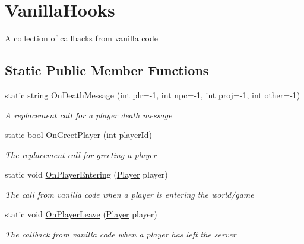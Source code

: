 \hypertarget{classOTA_1_1Callbacks_1_1VanillaHooks}{}\section{Vanilla\+Hooks}
\label{classOTA_1_1Callbacks_1_1VanillaHooks}


A collection of callbacks from vanilla code  


\subsection*{Static Public Member Functions}
\begin{DoxyCompactItemize}
\item 
static string \hyperlink{classOTA_1_1Callbacks_1_1VanillaHooks_af6587696a49cfe8ded654d3584e78f9a}{On\+Death\+Message} (int plr=-\/1, int npc=-\/1, int proj=-\/1, int other=-\/1)
\begin{DoxyCompactList}\small\item\em A replacement call for a player death message \end{DoxyCompactList}\item 
static bool \hyperlink{classOTA_1_1Callbacks_1_1VanillaHooks_a7745ee3ce6ec00d571ea2ad41b8c9979}{On\+Greet\+Player} (int player\+Id)
\begin{DoxyCompactList}\small\item\em The replacement call for greeting a player \end{DoxyCompactList}\item 
static void \hyperlink{classOTA_1_1Callbacks_1_1VanillaHooks_a4f1bd1b68f0d3a20e450b4b19d93b374}{On\+Player\+Entering} (\hyperlink{classOTA_1_1Callbacks_1_1Player}{Player} player)
\begin{DoxyCompactList}\small\item\em The call from vanilla code when a player is entering the world/game \end{DoxyCompactList}\item 
static void \hyperlink{classOTA_1_1Callbacks_1_1VanillaHooks_adb74152f1c3953d295cf6c71b31e2a2a}{On\+Player\+Leave} (\hyperlink{classOTA_1_1Callbacks_1_1Player}{Player} player)
\begin{DoxyCompactList}\small\item\em The callback from vanilla code when a player has left the server \end{DoxyCompactList}\end{DoxyCompactItemize}


